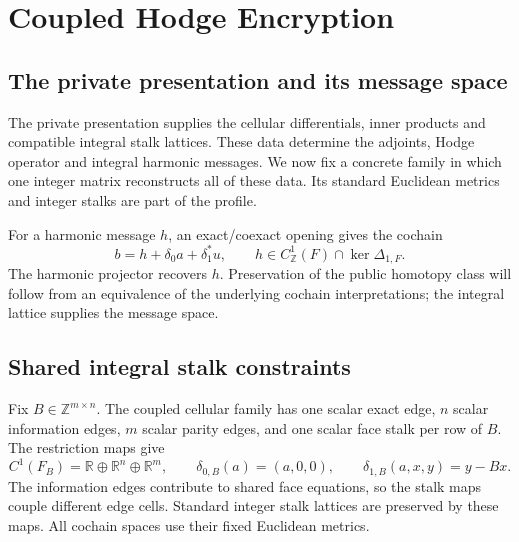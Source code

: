\section{Coupled Hodge Encryption}
\label{sec:coupled-harmonic-construction}

\subsection{The private presentation and its message space}

The private presentation supplies the cellular differentials, inner products
and compatible integral stalk lattices. These data determine the adjoints,
Hodge operator and integral harmonic messages. We now fix a concrete family
in which one integer matrix reconstructs all of these data. Its standard
Euclidean metrics and integer stalks are part of the profile.

For a harmonic message \(h\), an exact/coexact opening gives the cochain
\begin{equation}
 b=h+\delta_0a+\delta_1^*u,
 \qquad h\in C^1_{\mathbb Z}(F)\cap\ker\Delta_{1,F}.
 \label{eq:coupled-hodge-encryption}
\end{equation}
The harmonic projector recovers \(h\). Preservation of the public homotopy
class will follow from an equivalence of the underlying cochain
interpretations; the integral lattice supplies the message space.

\subsection{Shared integral stalk constraints}

Fix \(B\in\mathbb Z^{m\times n}\). The coupled cellular family has one scalar
exact edge, \(n\) scalar information edges, \(m\) scalar parity edges, and
one scalar face stalk per row of \(B\). The restriction maps give
\[
 C^1(F_B)=\mathbb R\oplus\mathbb R^n\oplus\mathbb R^m,
 \qquad
 \delta_{0,B}(a)=(a,0,0),\qquad
 \delta_{1,B}(a,x,y)=y-Bx.
\]
The information edges contribute to shared face equations, so the stalk maps
couple different edge cells. Standard integer stalk lattices are preserved by
these maps. All cochain spaces use their fixed Euclidean metrics.

